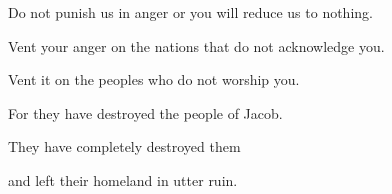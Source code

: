 {\par }{\Q Do not
punish us in anger
or
you will reduce us to nothing.
\par }{\Q {}Vent
your anger
on
the nations
that
do not
acknowledge
you.

\par }{\Q Vent
it on
the peoples
who
do not
worship
you.

\par }{\Q For
they have destroyed
the people of Jacob.
\par }{\Q They have completely destroyed
them

\par }{\Q and left their homeland
in utter ruin.

\par }

